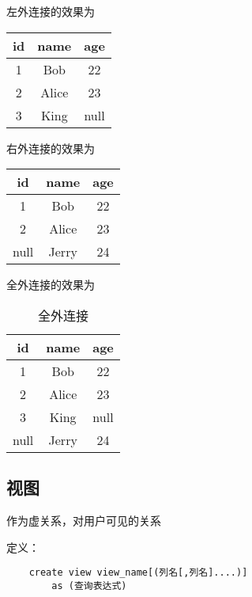 \documentclass{article}        %
\begin{document}
左外连接的效果为

\begin{table}[htbp]
    \centering
    \label{example02}
    \begin{tabular}{|c|c|c|}
        \hline 
        id&name&age \\ 
        \hline 
        1&Bob&22 \\
        \hline 
        2&Alice&23 \\ 
        \hline 
        3&King&null \\ 
        \hline 
    \end{tabular}
\end{table}

右外连接的效果为

\begin{table}[htbp]
    \centering
    \label{example03}
    \begin{tabular}{|c|c|c|}
        \hline 
        id&name&age \\ 
        \hline 
        1&Bob&22 \\
        \hline 
        2&Alice&23 \\ 
        \hline 
        null&Jerry&24 \\ 
        \hline 
    \end{tabular}
\end{table}

全外连接的效果为

\begin{table}[htbp]
    \centering
    \label{example04}
    \caption{全外连接}
    \begin{tabular}{|c|c|c|}
        \hline 
        id&name&age \\ 
        \hline 
        1&Bob&22 \\
        \hline 
        2&Alice&23 \\ 
        \hline 
        3&King&null \\ 
        \hline 
        null&Jerry&24 \\ 
        \hline 
    \end{tabular}
\end{table}

\subsection{视图}

作为虚关系，对用户可见的关系

定义：

\begin{verbatim}
    create view view_name[(列名[,列名]....)]
        as (查询表达式)
\end{verbatim}
\end{document}
